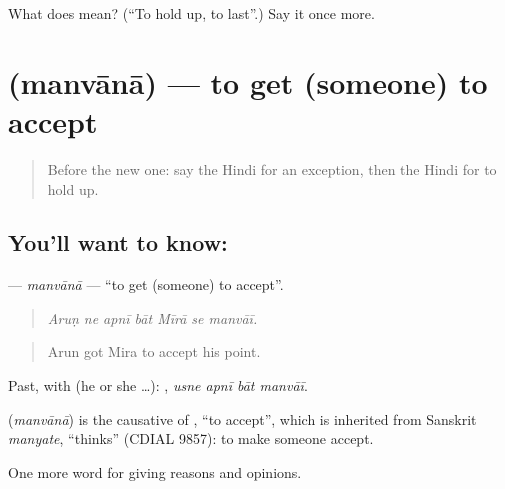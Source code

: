 \begin{tcolorbox}[breakable,colback=teal!4,colframe=teal!35!black,title={Before you move on}]
What does  mean? (\textquotedblleft{}To hold up, to last\textquotedblright{}.) Say it once more.
\end{tcolorbox}
\section[\texorpdfstring{\hi{मनवाना} (manvānā)}{मनवाना (manvānā)}]{ (manvānā) — to get (someone) to accept}

\label{lesson:HI-C365-manvana}



\begin{quote}
Before the new one: say the Hindi for an exception, then the Hindi for to hold up.
\end{quote}

\subsection*{You'll want to know: }
\textbf{} — \emph{manvānā} — \textquotedblleft{}to get (someone) to accept\textquotedblright{}.

\begin{quote}
      
\end{quote}

\begin{quote}
\emph{Aruṇ ne apnī bāt Mīrā se manvāī.}
\end{quote}

\begin{quote}
Arun got Mira to accept his point.
\end{quote}

Past, with  (he or she …):    , \emph{usne apnī bāt manvāī}.

\begin{cousinweb}
\textbf{} (\emph{manvānā}) is the causative of , \textquotedblleft{}to accept\textquotedblright{}, which is inherited from Sanskrit \emph{manyate}, \textquotedblleft{}thinks\textquotedblright{} (CDIAL 9857): to make someone accept.
\end{cousinweb}

\begin{grammarlens}[title={What you've built}]
One more word for giving reasons and opinions.
\end{grammarlens}

